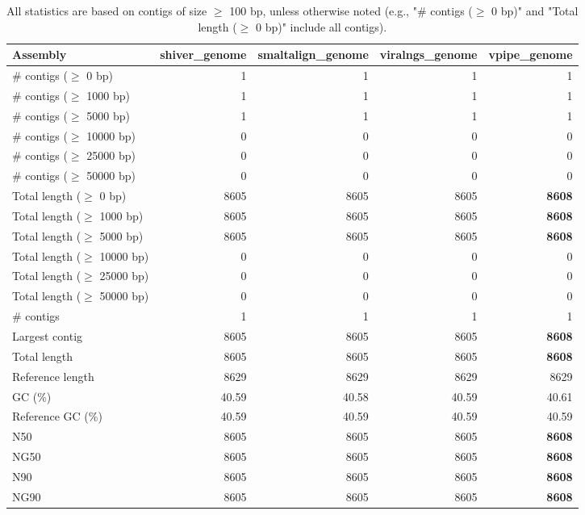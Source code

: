 \documentclass[12pt,a4paper]{article}
\begin{document}
\begin{table}[ht]
\begin{center}
\caption{All statistics are based on contigs of size $\geq$ 100 bp, unless otherwise noted (e.g., "\# contigs ($\geq$ 0 bp)" and "Total length ($\geq$ 0 bp)" include all contigs).}
\begin{tabular}{|l*{4}{|r}|}
\hline
Assembly & shiver\_genome & smaltalign\_genome & viralngs\_genome & vpipe\_genome \\ \hline
\# contigs ($\geq$ 0 bp) & 1 & 1 & 1 & 1 \\ \hline
\# contigs ($\geq$ 1000 bp) & 1 & 1 & 1 & 1 \\ \hline
\# contigs ($\geq$ 5000 bp) & 1 & 1 & 1 & 1 \\ \hline
\# contigs ($\geq$ 10000 bp) & 0 & 0 & 0 & 0 \\ \hline
\# contigs ($\geq$ 25000 bp) & 0 & 0 & 0 & 0 \\ \hline
\# contigs ($\geq$ 50000 bp) & 0 & 0 & 0 & 0 \\ \hline
Total length ($\geq$ 0 bp) & 8605 & 8605 & 8605 & {\bf 8608} \\ \hline
Total length ($\geq$ 1000 bp) & 8605 & 8605 & 8605 & {\bf 8608} \\ \hline
Total length ($\geq$ 5000 bp) & 8605 & 8605 & 8605 & {\bf 8608} \\ \hline
Total length ($\geq$ 10000 bp) & 0 & 0 & 0 & 0 \\ \hline
Total length ($\geq$ 25000 bp) & 0 & 0 & 0 & 0 \\ \hline
Total length ($\geq$ 50000 bp) & 0 & 0 & 0 & 0 \\ \hline
\# contigs & 1 & 1 & 1 & 1 \\ \hline
Largest contig & 8605 & 8605 & 8605 & {\bf 8608} \\ \hline
Total length & 8605 & 8605 & 8605 & {\bf 8608} \\ \hline
Reference length & 8629 & 8629 & 8629 & 8629 \\ \hline
GC (\%) & 40.59 & 40.58 & 40.59 & 40.61 \\ \hline
Reference GC (\%) & 40.59 & 40.59 & 40.59 & 40.59 \\ \hline
N50 & 8605 & 8605 & 8605 & {\bf 8608} \\ \hline
NG50 & 8605 & 8605 & 8605 & {\bf 8608} \\ \hline
N90 & 8605 & 8605 & 8605 & {\bf 8608} \\ \hline
NG90 & 8605 & 8605 & 8605 & {\bf 8608} \\ \hline

\end{tabular}
\end{center}
\end{table}
\end{document}
